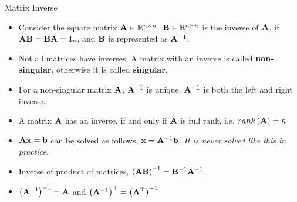 \documentclass[aspectratio=169]{beamer}
\begin{document}
\begin{frame}[t]{Matrix Inverse}
  \begin{small}
    \begin{itemize}
      \item Consider the square matrix $\mathbf{A} \in \mathbb{R}^{n \times n}$. $\mathbf{B} \in \mathbb{R}^{n \times n}$ is the inverse of $\mathbf{A}$, if $\mathbf{AB} = \mathbf{BA} = \mathbf{I}_n$, and $\mathbf{B}$ is represented as $\mathbf{A}^{-1}$.
      \item Not all matrices have inverses. A matrix with an inverse is called \textbf{non-singular}, otherwise it is called \textbf{singular}.
      \item For a non-singular matrix $\mathbf{A}$, $\mathbf{A}^{-1}$ is unique. $\mathbf{A}^{-1}$ is both the left and right inverse.
      \item A matrix $\mathbf{A}$ has an inverse, if and only if $\mathbf{A}$ is full rank, i.e. $rank\left(\mathbf{A}\right) = n$
      \item $\mathbf{Ax} = \mathbf{b}$ can be solved as follows, $\mathbf{x} = \mathbf{A}^{-1}\mathbf{b}$. \textit{It is never solved like this in practice.}
      \item Inverse of product of matrices, $\left(\mathbf{AB}\right)^{-1} = \mathbf{B}^{-1}\mathbf{A}^{-1}$.
      \item $\left(\mathbf{A}^{-1}\right)^{-1} = \mathbf{A}$ and $\left(\mathbf{A}^{-1}\right)^{\top} = \left(\mathbf{A}^{\top}\right)^{-1}$
    \end{itemize}
  \end{small}
\end{frame}
\end{document}
